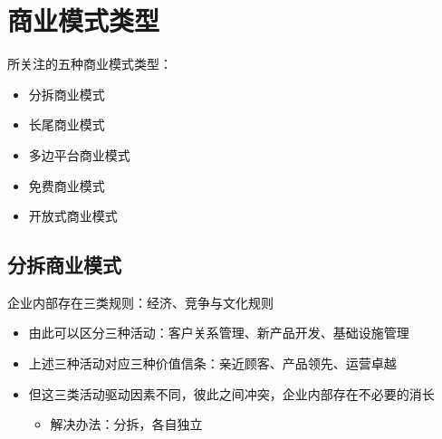 \section{商业模式类型}
所关注的五种商业模式类型：
\begin{itemize}
    \item 分拆商业模式
    \item 长尾商业模式
    \item 多边平台商业模式
    \item 免费商业模式
    \item 开放式商业模式
\end{itemize}

\subsection{分拆商业模式}

企业内部存在三类规则：经济、竞争与文化规则
\begin{itemize}
    \item 由此可以区分三种活动：客户关系管理、新产品开发、基础设施管理
    \item 上述三种活动对应三种价值信条：亲近顾客、产品领先、运营卓越
    \item 但这三类活动驱动因素不同，彼此之间冲突，企业内部存在不必要的消长
    \begin{itemize}
        \item 解决办法：分拆，各自独立
    \end{itemize}
\end{itemize}

